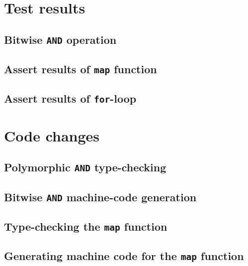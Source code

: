 \newpage
\section{Test results}
\label{ch:appendix|sec:tests}

\subsection{Bitwise {\tt AND} operation}
\label{ch:appendix|sec:tests|sub:and-assert}


\subsection{Assert results of {\tt map} function}
\label{ch:appendix|sec:tests|sub:map-assert}


\subsection{Assert results of {\tt for}-loop}
\label{ch:appendix|sec:tests|sub:forloop}



\newpage
\section{Code changes}
\label{ch:appendix|sec:code}

\subsection{Polymorphic {\tt AND} type-checking}
\label{ch:appendix|sec:code|sub:and-type}


\subsection{Bitwise {\tt AND} machine-code generation}
\label{ch:appendix|sec:code|sub:and-machinecode}


\subsection{Type-checking the {\tt map} function}
\label{ch:appendix|sec:code|sub:map-type}


\subsection{Generating machine code for the {\tt map} function}
\label{ch:appendix|sec:code|sub:map-machine}


